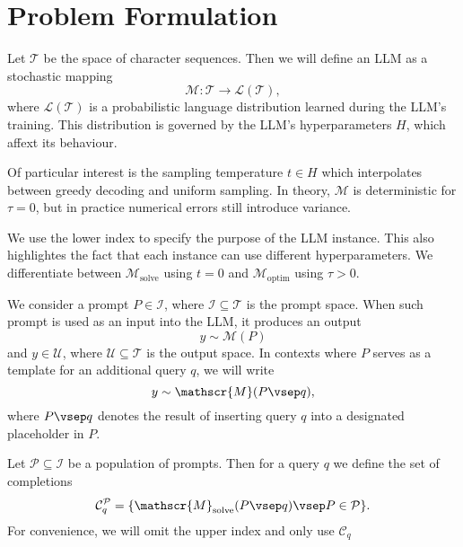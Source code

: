 
\section{Problem Formulation}\label{sec:notation}
Let $\mathcal{T}$ be the space of character sequences. Then we will define an LLM as a stochastic mapping
\begin{equation}
    \mathscr{M}: \mathcal{T} \rightarrow \mathcal{L}(\mathcal{T}),
\end{equation}
where $\mathcal{L}(\mathcal{T})$ is a probabilistic language distribution learned during the LLM's training.
This distribution is governed by the LLM's hyperparameters $H$, which affext its behaviour. 

Of particular interest is the sampling temperature $t \in H$ which interpolates between greedy decoding and uniform sampling.
In theory, $\mathscr{M}$ is deterministic for $\tau=0$, but in practice numerical errors still introduce variance.

We use the lower index to specify the purpose of the LLM instance. This also highlightes
the fact that each instance can use different hyperparameters. We differentiate between $\mathscr{M}_{\text{solve}}$ using $t=0$ and 
$\mathscr{M}_{\text{optim}}$ using $\tau>0$. 

We consider a prompt $P \in \mathcal{I}$, where $\mathcal{I} \subseteq \mathcal{T}$ is the prompt space.
When such prompt is used as an input into the LLM, it produces an output
\begin{equation}
    y \sim \mathscr{M}(P)
\end{equation}
and $y \in \mathcal{U}$, where
$\mathcal{U} \subseteq \mathcal{T}$ is the output space.
In contexts where $P$ serves as a template for an additional query $q$, we will write
\begin{equation}
    y \sim \mathscr{M}(P\vsep q),
\end{equation}
where $P \vsep q$ denotes the result of inserting query $q$ into a designated placeholder in $P$.

Let $\mathcal{P} \subseteq \mathcal{I}$ be a population of prompts. Then for a query $q$ we define the set of completions 
\begin{equation}
    \mathcal{C}_{q}^{\mathcal{P}} = \{\mathscr{M}_{\text{solve}}(P\vsep q)\vsep P \in \mathcal{P}\}.
\end{equation}
For convenience, we will omit the upper index and only use $\mathcal{C}_{q}$

